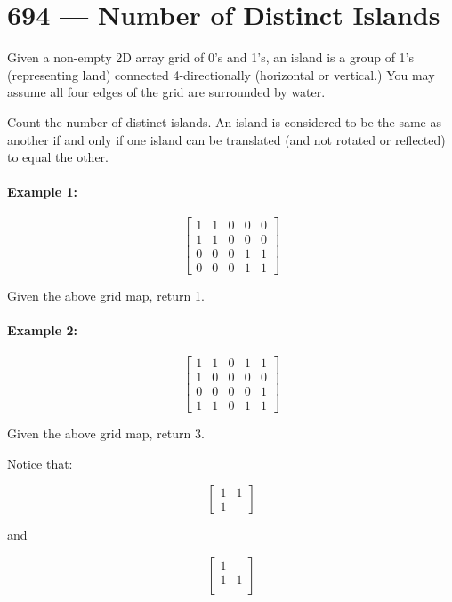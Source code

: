 \section{694 --- Number of Distinct Islands}
Given a non-empty 2D array grid of 0's and 1's, an island is a group of 1's (representing land) connected 4-directionally (horizontal or vertical.) You may assume all four edges of the grid are surrounded by water.

Count the number of distinct islands. An island is considered to be the same as another if and only if one island can be translated (and not rotated or reflected) to equal the other.

\paragraph{Example 1:}

\begin{flushleft}
\[
\begin{bmatrix}
1 & 1 & 0 & 0 & 0 \\
1 & 1 & 0 & 0 & 0 \\
0 & 0 & 0 & 1 & 1 \\
0 & 0 & 0 & 1 & 1
\end{bmatrix}
\]


Given the above grid map, return 1.

\end{flushleft}

\paragraph{Example 2:}

\begin{flushleft}
\[
\begin{bmatrix}
1 & 1 & 0 & 1 & 1\\
1 & 0 & 0 & 0 & 0\\
0 & 0 & 0 & 0 & 1\\
1 & 1 & 0 & 1 & 1
\end{bmatrix}
\]


Given the above grid map, return 3.

\end{flushleft}

\begin{flushleft}
Notice that:

\[
\begin{bmatrix}
1 & 1\\
1 &
\end{bmatrix}
\]

and

\[
\begin{bmatrix}
1 & \\
1 & 1\\
\end{bmatrix}
\]
\end{flushleft}

